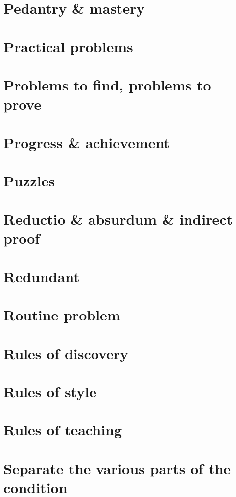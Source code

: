 \documentclass[oneside]{book}
\numberwithin{equation}{section}
\begin{document}
\section{Pedantry \& mastery}

\section{Practical problems}

\section{Problems to find, problems to prove}

\section{Progress \& achievement}

\section{Puzzles}

\section{Reductio \& absurdum \& indirect proof}

\section{Redundant}

\section{Routine problem}

\section{Rules of discovery}

\section{Rules of style}

\section{Rules of teaching}

\section{Separate the various parts of the condition}
\end{document}
